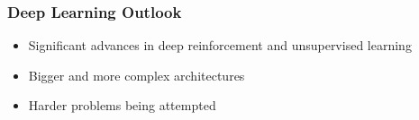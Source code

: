 \begin{frame}[fragile] \frametitle{Deep Learning Outlook}
\begin{itemize}
\item Significant advances in deep reinforcement and unsupervised learning
\item Bigger and more complex architectures
\item Harder problems being attempted
\end{itemize}
\end{frame}

